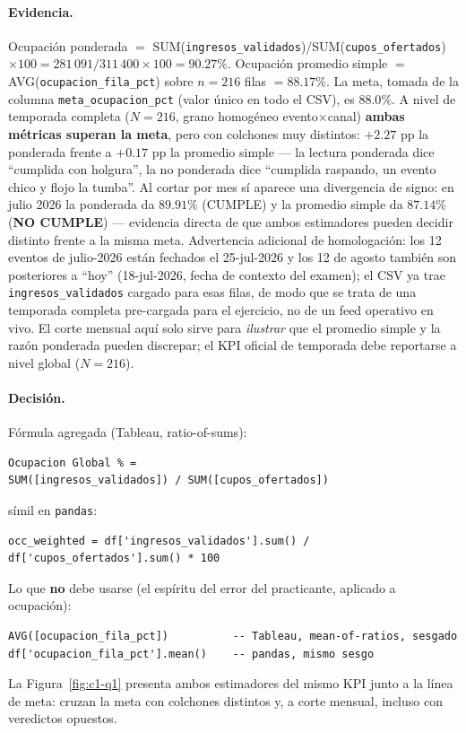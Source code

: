 \paragraph{Evidencia.} Ocupación ponderada $=$ SUM(\lstinline|ingresos_validados|)/SUM(\lstinline|cupos_ofertados|)$\times 100 = 281\,091/311\,400\times 100 = 90.27\%$. Ocupación promedio simple $=$ AVG(\lstinline|ocupacion_fila_pct|) sobre $n=216$ filas $= 88.17\%$. La meta, tomada de la columna \lstinline|meta_ocupacion_pct| (valor único en todo el CSV), es $88.0\%$. A nivel de temporada completa ($N=216$, grano homogéneo evento$\times$canal) \textbf{ambas métricas superan la meta}, pero con colchones muy distintos: $+2.27$ pp la ponderada frente a $+0.17$ pp la promedio simple — la lectura ponderada dice \enquote{cumplida con holgura}, la no ponderada dice \enquote{cumplida raspando, un evento chico y flojo la tumba}. Al cortar por mes sí aparece una divergencia de signo: en julio 2026 la ponderada da $89.91\%$ (CUMPLE) y la promedio simple da $87.14\%$ (\textbf{NO CUMPLE}) — evidencia directa de que ambos estimadores pueden decidir distinto frente a la misma meta. Advertencia adicional de homologación: los 12 eventos de julio-2026 están fechados el 25-jul-2026 y los 12 de agosto también son posteriores a \enquote{hoy} (18-jul-2026, fecha de contexto del examen); el CSV ya trae \lstinline|ingresos_validados| cargado para esas filas, de modo que se trata de una temporada completa pre-cargada para el ejercicio, no de un feed operativo en vivo. El corte mensual aquí solo sirve para \emph{ilustrar} que el promedio simple y la razón ponderada pueden discrepar; el KPI oficial de temporada debe reportarse a nivel global ($N=216$).

\paragraph{Decisión.} Fórmula agregada (Tableau, ratio-of-sums):
\begin{lstlisting}[style=cod]
Ocupacion Global % =
SUM([ingresos_validados]) / SUM([cupos_ofertados])
\end{lstlisting}
símil en \lstinline|pandas|:
\begin{lstlisting}[style=cod]
occ_weighted = df['ingresos_validados'].sum() / df['cupos_ofertados'].sum() * 100
\end{lstlisting}
Lo que \textbf{no} debe usarse (el espíritu del error del practicante, aplicado a ocupación):
\begin{lstlisting}[style=cod]
AVG([ocupacion_fila_pct])          -- Tableau, mean-of-ratios, sesgado
df['ocupacion_fila_pct'].mean()    -- pandas, mismo sesgo
\end{lstlisting}
La Figura~\ref{fig:c1-q1} presenta ambos estimadores del mismo KPI junto a la línea de meta: cruzan la meta con colchones distintos y, a corte mensual, incluso con veredictos opuestos.

